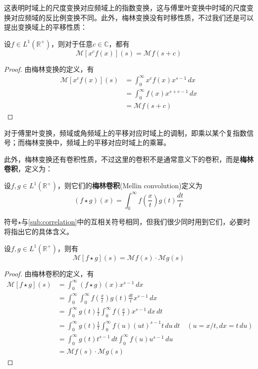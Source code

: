 \documentclass{ctexbook}
\begin{document}
这表明时域上的尺度变换对应频域上的指数变换，这与傅里叶变换中时域的尺度变换对应频域的反比例变换不同。此外，梅林变换没有时移性质，不过我们还是可以提出变换域上的平移性质：

\begin{proposition}[梅林变换的乘幂性质]
    设$f\in L^1(\mathbb{R}^+)$，则对于任意$c\in\mathbb{C}$，都有
    \[\mathcal{M} [x^c f(x)](s)=\mathcal{M} f(s+c)\]
\end{proposition}
\begin{proof}
    由梅林变换的定义，有
    \begin{align*}
        \mathcal{M} [x^c f(x)](s)&=\int_0^{\infty}x^c f(x)x^{s-1}\,dx\\
        &=\int_0^{\infty}f(x)x^{s+c-1}\,dx\\
        &=\mathcal{M} f(s+c)
    \end{align*}
\end{proof}

对于傅里叶变换，频域或角频域上的平移对应时域上的调制，即乘以某个复指数信号；而梅林变换中，频域上的平移对应时域上的乘幂。

此外，梅林变换还有卷积性质，不过这里的卷积不是通常意义下的卷积，而是\textbf{梅林卷积}，定义为：
\begin{definition}[梅林卷积]
    设$f,g\in L^1(\mathbb{R}^+)$，则它们的\textbf{梅林卷积}(Mellin convolution)定义为
    \[(f\star g)(x)=\int_0^{\infty}f\left(\frac{x}{t}\right)g(t)\frac{dt}{t}\]
\end{definition}

符号$\star$与\ref{sub:correlation}中的互相关符号相同，但我们很少同时用到它们，必要时将指出它的具体含义。


\begin{proposition}[梅林卷积的变换性质]
    设$f,g\in L^1(\mathbb{R}^+)$，则有
    \[\mathcal{M} [f\star g](s)=\mathcal{M} f(s)\cdot \mathcal{M} g(s)\]
\end{proposition}
\begin{proof}
    由梅林卷积的定义，有
    \begin{align*}
        \mathcal{M} [f\star g](s)&=\int_0^{\infty}(f\star g)(x)x^{s-1}\,dx\\
        &=\int_0^{\infty}\int_0^{\infty}f\left(\frac{x}{t}\right)g(t)\frac{dt}{t}x^{s-1}\,dx\\
        &=\int_0^{\infty}g(t)\frac{1}{t}\int_0^{\infty}f\left(\frac{x}{t}\right)x^{s-1}\,dx\,dt\\
        &=\int_0^{\infty}g(t)\frac{1}{t}\int_0^{\infty}f(u)(ut)^{s-1}t\,du\,dt\quad (u=x/t,dx=t\,du)\\
        &=\int_0^{\infty}g(t)t^{s-1}\,dt\int_0^{\infty}f(u)u^{s-1}\,du\\
        &=\mathcal{M} f(s)\cdot \mathcal{M} g(s)
    \end{align*}
\end{proof}
\end{document}
